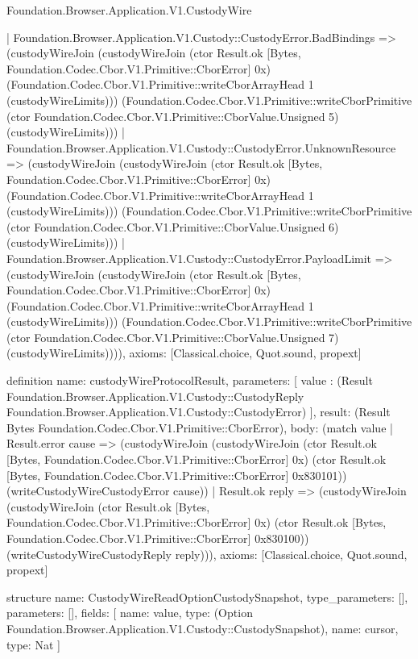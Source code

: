 \begin{lexlean}{Foundation.Browser.Application.V1.CustodyWire}
\begin{semanticmodule}
{    | Foundation.Browser.Application.V1.Custody::CustodyError.BadBindings => (custodyWireJoin (custodyWireJoin (ctor Result.ok [Bytes, Foundation.Codec.Cbor.V1.Primitive::CborError] 0x) (Foundation.Codec.Cbor.V1.Primitive::writeCborArrayHead 1 (custodyWireLimits))) (Foundation.Codec.Cbor.V1.Primitive::writeCborPrimitive (ctor Foundation.Codec.Cbor.V1.Primitive::CborValue.Unsigned 5) (custodyWireLimits)))
    | Foundation.Browser.Application.V1.Custody::CustodyError.UnknownResource => (custodyWireJoin (custodyWireJoin (ctor Result.ok [Bytes, Foundation.Codec.Cbor.V1.Primitive::CborError] 0x) (Foundation.Codec.Cbor.V1.Primitive::writeCborArrayHead 1 (custodyWireLimits))) (Foundation.Codec.Cbor.V1.Primitive::writeCborPrimitive (ctor Foundation.Codec.Cbor.V1.Primitive::CborValue.Unsigned 6) (custodyWireLimits)))
    | Foundation.Browser.Application.V1.Custody::CustodyError.PayloadLimit => (custodyWireJoin (custodyWireJoin (ctor Result.ok [Bytes, Foundation.Codec.Cbor.V1.Primitive::CborError] 0x) (Foundation.Codec.Cbor.V1.Primitive::writeCborArrayHead 1 (custodyWireLimits))) (Foundation.Codec.Cbor.V1.Primitive::writeCborPrimitive (ctor Foundation.Codec.Cbor.V1.Primitive::CborValue.Unsigned 7) (custodyWireLimits)))),
  axioms: [Classical.choice, Quot.sound, propext]
}

definition{
  name: custodyWireProtocolResult,
  parameters: [
    value : (Result Foundation.Browser.Application.V1.Custody::CustodyReply Foundation.Browser.Application.V1.Custody::CustodyError)
  ],
  result: (Result Bytes Foundation.Codec.Cbor.V1.Primitive::CborError),
  body: (match value
    | Result.error cause => (custodyWireJoin (custodyWireJoin (ctor Result.ok [Bytes, Foundation.Codec.Cbor.V1.Primitive::CborError] 0x) (ctor Result.ok [Bytes, Foundation.Codec.Cbor.V1.Primitive::CborError] 0x830101)) (writeCustodyWireCustodyError cause))
    | Result.ok reply => (custodyWireJoin (custodyWireJoin (ctor Result.ok [Bytes, Foundation.Codec.Cbor.V1.Primitive::CborError] 0x) (ctor Result.ok [Bytes, Foundation.Codec.Cbor.V1.Primitive::CborError] 0x830100)) (writeCustodyWireCustodyReply reply))),
  axioms: [Classical.choice, Quot.sound, propext]
}

structure{
  name: CustodyWireReadOptionCustodySnapshot,
  type_parameters: [],
  parameters: [],
  fields: [
    {name: value, type: (Option Foundation.Browser.Application.V1.Custody::CustodySnapshot)},
    {name: cursor, type: Nat}
  ]
}


\end{semanticmodule}
\end{lexlean}
